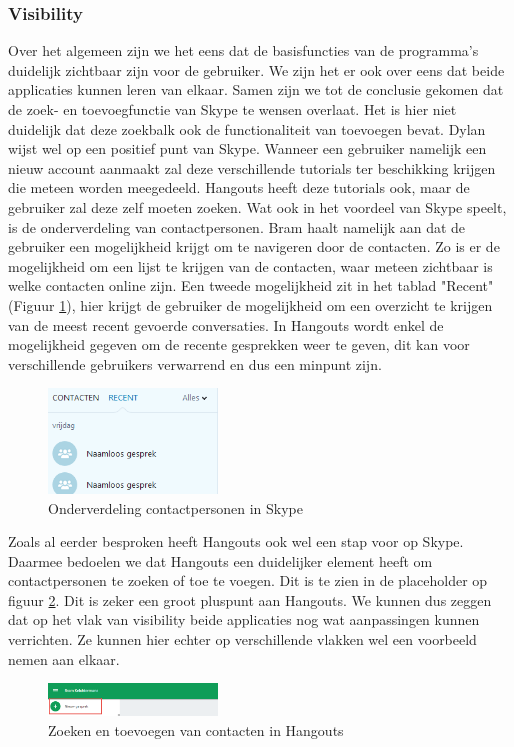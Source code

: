 \documentclass[11pt]{article}
\begin{document}
\subsubsection{Visibility}
Over het algemeen zijn we het eens dat de basisfuncties van de programma's duidelijk zichtbaar zijn voor de gebruiker. We zijn het er ook over eens dat beide applicaties kunnen leren van elkaar. Samen zijn we tot de conclusie gekomen dat de zoek- en toevoegfunctie van Skype te wensen overlaat. Het is hier niet duidelijk dat deze zoekbalk ook de functionaliteit van toevoegen bevat. Dylan wijst wel op een positief punt van Skype. Wanneer een gebruiker namelijk een nieuw account aanmaakt zal deze verschillende tutorials ter beschikking krijgen die meteen worden meegedeeld. Hangouts heeft deze tutorials ook, maar de gebruiker zal deze zelf moeten zoeken. \newline Wat ook in het voordeel van Skype speelt, is de onderverdeling van contactpersonen. Bram haalt namelijk aan dat de gebruiker een mogelijkheid krijgt om te navigeren door de contacten. Zo is er de mogelijkheid om een lijst te krijgen van de contacten, waar meteen zichtbaar is welke contacten online zijn. Een tweede mogelijkheid zit in het tablad "Recent" (Figuur \ref{fig:SkypeTabblad}), hier krijgt de gebruiker de mogelijkheid om een overzicht te krijgen van de meest recent gevoerde conversaties. In Hangouts wordt enkel de mogelijkheid gegeven om de recente gesprekken weer te geven, dit kan voor verschillende gebruikers verwarrend en dus een minpunt zijn.
\begin{figure}
	\centering
	\includegraphics[width=0.4\textwidth]{Samen_SkypeTabblad.png}
	\caption{Onderverdeling contactpersonen in Skype}
	\label{fig:SkypeTabblad}
\end{figure}
\newline
Zoals al eerder besproken heeft Hangouts ook wel een stap voor op Skype. Daarmee bedoelen we dat Hangouts een duidelijker element heeft om contactpersonen te zoeken of toe te voegen. Dit is te zien in de placeholder op figuur \ref{fig:HangoutsNew}. Dit is zeker een groot pluspunt aan Hangouts.
\newline
We kunnen dus zeggen dat op het vlak van visibility beide applicaties nog wat aanpassingen kunnen verrichten. Ze kunnen hier echter op verschillende vlakken wel een voorbeeld nemen aan elkaar.
\begin{figure}
	\centering
	\includegraphics[width=0.4\textwidth]{Samen_HangoutsNew.png}
	\caption{Zoeken en toevoegen van contacten in Hangouts}
	\label{fig:HangoutsNew}
\end{figure}
\end{document}
